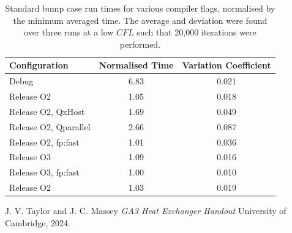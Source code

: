 \documentclass{article}
\begin{document}
\begin{table}[H]
    \centering
    \begin{tabular}{lcc}
        \toprule
        \textbf{Configuration} & \textbf{Normalised Time}\footnotemark  & \textbf{Variation Coefficient} \\
        \midrule
        Debug & 6.83 & 0.021 \\
        Release O2 & 1.05 & 0.018 \\
        Release O2, QxHost & 1.69 & 0.049 \\
        Release O2, Qparallel & 2.66 & 0.087 \\
        Release O2, fp:fast & 1.01 & 0.036 \\
        Release O3 & 1.09 & 0.016 \\
        Release O3, fp:fast & 1.00 & 0.010 \\
        Release O2 & 1.03 & 0.019 \\
        \bottomrule
    \end{tabular}
    \caption{Standard bump case run times for various compiler flags, normalised by the minimum averaged time. The average and deviation were found over three runs at a low $CFL$ such that 20,000 iterations were performed.}
    \label{tab:performance}
\end{table}


\begin{thebibliography}{9}

  J. V. Taylor and J. C. Massey
  \emph{GA3 Heat Exchanger Handout}
  University of Cambridge,
  2024.

\end{thebibliography}
\end{document}
